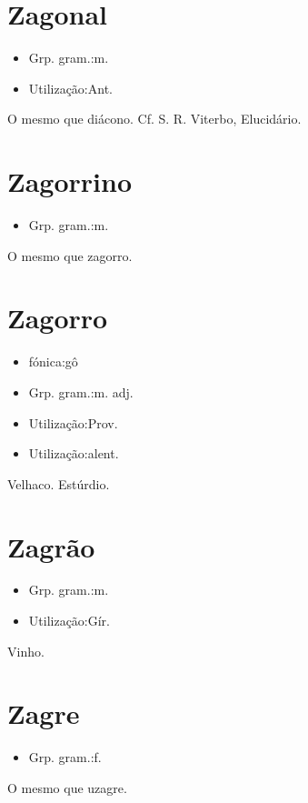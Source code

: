 \section{Zagonal}
\begin{itemize}
\item {Grp. gram.:m.}
\end{itemize}
\begin{itemize}
\item {Utilização:Ant.}
\end{itemize}
O mesmo que \textunderscore diácono\textunderscore . Cf. S. R. Viterbo, \textunderscore Elucidário\textunderscore .
\section{Zagorrino}
\begin{itemize}
\item {Grp. gram.:m.}
\end{itemize}
O mesmo que \textunderscore zagorro\textunderscore .
\section{Zagorro}
\begin{itemize}
\item {fónica:gô}
\end{itemize}
\begin{itemize}
\item {Grp. gram.:m. adj.}
\end{itemize}
\begin{itemize}
\item {Utilização:Prov.}
\end{itemize}
\begin{itemize}
\item {Utilização:alent.}
\end{itemize}
Velhaco.
Estúrdio.
\section{Zagrão}
\begin{itemize}
\item {Grp. gram.:m.}
\end{itemize}
\begin{itemize}
\item {Utilização:Gír.}
\end{itemize}
Vinho.
\section{Zagre}
\begin{itemize}
\item {Grp. gram.:f.}
\end{itemize}
O mesmo que \textunderscore uzagre\textunderscore .
